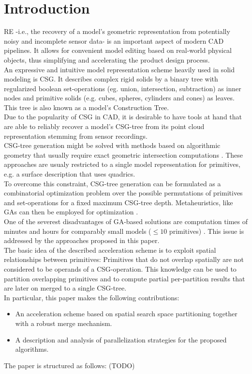\section{Introduction}
\ac{RE} -i.e., the recovery of a model's geometric representation from potentially noisy and incomplete sensor data- is an important aspect of modern \ac{CAD} pipelines. 
It allows for convenient model editing based on real-world physical objects, thus simplifying and accelerating the product design process.
\\
An expressive and intuitive model representation scheme heavily used in solid modeling is \ac{CSG}.
It describes complex rigid solids by a binary tree with regularized boolean set-operations (eg. union, intersection, subtraction) as inner nodes and primitive solids (e.g. cubes, spheres, cylinders and cones) as leaves. 
This tree is also known as a model's Construction Tree.
\\
Due to the popularity of \ac{CSG} in \ac{CAD}, it is desirable to have tools at hand that are able to reliably recover a model's \ac{CSG}-tree from its point cloud representation stemming from sensor recordings.
\\
\ac{CSG}-tree generation might be solved with methods based on algorithmic geometry that usually require exact geometric intersection computations \cite{shapiro1993separation, buchele2004three}. 
These approaches are usualy restricted to a single model representation for primitives, e.g. a surface description that uses quadrics. 
\\  
To overcome this constraint, \ac{CSG}-tree generation can be formulated as a combinatorial optimization problem over the possible permutations of primitives and set-operations for a fixed maximum \ac{CSG}-tree depth.
Metaheuristics, like \acp{GA} can then be employed for optimization \cite{mitchell1998introduction}.
\\
One of the severest disadvantages of \ac{GA}-based solutions are computation times of minutes and hours for comparably small models ($\le 10$ primitives) \cite{fayolle2016evolutionary}.
This issue is addressed by the approaches proposed in this paper.  
\\
The basic idea of the described acceleration scheme is to exploit spatial relationships between primitives: 
Primitives that do not overlap spatially are not considered to be operands of a \ac{CSG}-operation.
This knowledge can be used to partition overlapping primitives and to compute partial per-partition results that are later on merged to a single \ac{CSG}-tree. 
\\
In particular, this paper makes the following contributions:
\begin{itemize}
\item An acceleration scheme based on spatial search space partitioning together with a robust merge mechanism.
\item A description and analysis of parallelization strategies for the proposed algorithms.
\end{itemize}  
The paper is structured as follows: (TODO)
\copyrightspace


